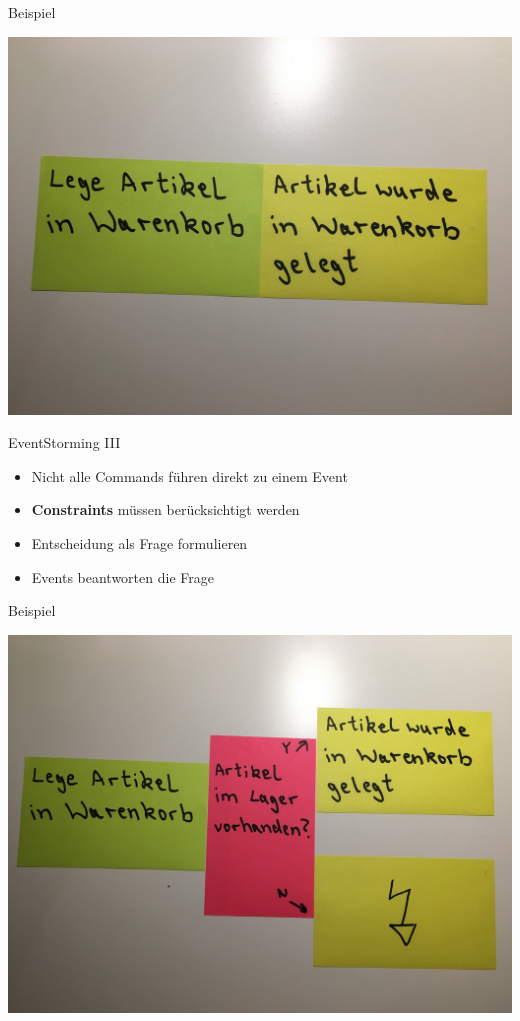 \begin{frame}[fragile]{Beispiel}

\begin{center}
\includegraphics[width=.7\textwidth]{pics/eventstorming2.jpg}
\end{center}

\end{frame}


\begin{frame}[fragile]{EventStorming III}

\begin{itemize}
\item Nicht alle Commands führen direkt zu einem Event
\item \textbf{Constraints} müssen berücksichtigt werden
\item Entscheidung als Frage formulieren
\item Events beantworten die Frage
\end{itemize}

\end{frame}

\begin{frame}[fragile]{Beispiel}

\begin{center}
\includegraphics[width=.85\textwidth]{pics/eventstorming3.jpg}
\end{center}

\end{frame}


